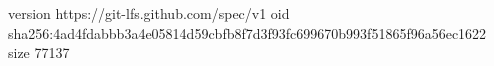 version https://git-lfs.github.com/spec/v1
oid sha256:4ad4fdabbb3a4e05814d59cbfb8f7d3f93fc699670b993f51865f96a56ec1622
size 77137

